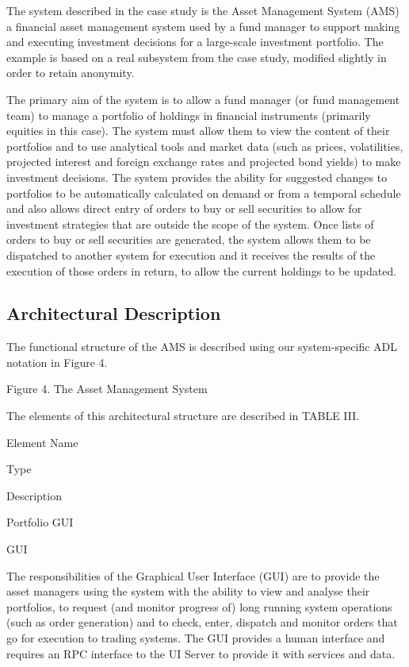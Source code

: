 \begin{itemise}

  The system described in the case study is the Asset Management System (AMS) a financial asset management system used by a fund manager to support making and executing investment decisions for a large-scale investment portfolio.  The example is based on a real subsystem from the case study, modified slightly in order to retain anonymity.

  The primary aim of the system is to allow a fund manager (or fund management team) to manage a portfolio of holdings in financial instruments (primarily equities in this case).  The system must allow them to view the content of their portfolios and to use analytical tools and market data (such as prices, volatilities, projected interest and foreign exchange rates and projected bond yields) to make investment decisions.  The system provides the ability for suggested changes to portfolios to be automatically calculated on demand or from a temporal schedule and also allows direct entry of orders to buy or sell securities to allow for investment strategies that are outside the scope of the system.  Once lists of orders to buy or sell securities are generated, the system allows them to be dispatched to another system for execution and it receives the results of the execution of those orders in return, to allow the current holdings to be updated.

\subsection{Architectural Description}

  The functional structure of the AMS is described using our system-specific ADL notation in Figure 4. 

  

  

Figure 4.  The Asset Management System

  The elements of this architectural structure are described in TABLE III. 

  

Element Name

Type

Description

Portfolio GUI

GUI

The responsibilities of the Graphical User Interface (GUI) are to provide the asset managers using the system with the ability to view and analyse their portfolios, to request (and monitor progress of) long running system operations (such as order generation) and to check, enter, dispatch and monitor orders that go for execution to trading systems.  The GUI provides a human interface and requires an RPC interface to the UI Server to provide it with services and data.


\end{itemise}
